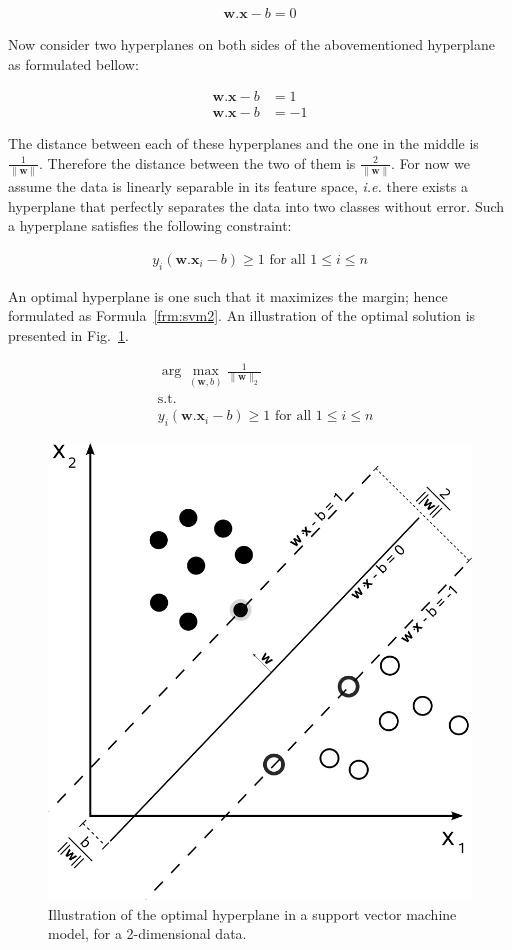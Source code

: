 \begin{align}
  \mathbf{w} . \mathbf{x} - b = 0
  \label{frm:hyperplane}
\end{align}

Now consider two hyperplanes on both sides of the abovementioned hyperplane as formulated bellow:

\begin{align}
  \mathbf{w} . \mathbf{x} - b &= 1 \nonumber \\
  \mathbf{w} . \mathbf{x} - b &= -1
\end{align}

The distance between each of these hyperplanes and the one in the middle is $\frac{1}{\parallel \mathbf{w} \parallel}$. Therefore the distance between the two of them is $\frac{2}{\parallel \mathbf{w} \parallel}$. For now we assume the data is linearly separable in its feature space, \emph{i.e.} there exists a hyperplane that perfectly separates the data into two classes without error. Such a hyperplane satisfies the following constraint:

\begin{align}
  y_i (\mathbf{w} . \mathbf{x}_i - b)\geq 1 \text{ for all } 1 \leq i \leq n
\end{align}

An optimal hyperplane is one such that it maximizes the margin; hence formulated as Formula~\ref{frm:svm2}. An illustration of the optimal solution is presented in Fig.~\ref{fig:svm-hyperplane}.

\begin{align}
  &\arg\max_{(\mathbf{w},b)}\frac{1}{\|\mathbf{w}\|_2} \nonumber \\
  &\text{s.t.} \nonumber \\
  &y_i (\mathbf{w} . \mathbf{x}_i - b)\geq 1 \text{ for all } 1 \leq i \leq n
  \label{frm:svm2}
\end{align}

\begin{figure}[!ht]
  \centering
  \includegraphics[width=.5\textwidth]{figs/background/Svm_max_sep_hyperplane_with_margin}
  \caption{Illustration of the optimal hyperplane in a support vector machine model, for a 2-dimensional data.}
  \label{fig:svm-hyperplane}
\end{figure}

